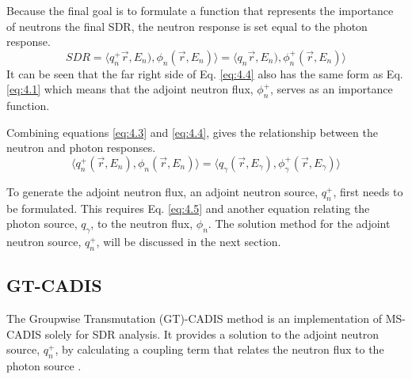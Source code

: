 Because the final goal is to formulate a function that represents the importance
of neutrons the final SDR, the
neutron response is set equal to the photon response.
\begin{equation} \label{eq:4.4}
  SDR =  \langle q_{n}^{+}\overrightarrow{r},E_{n}),
  \phi_{n}(\overrightarrow{r}, E_{n}) \rangle 
  = \langle q_{n}\overrightarrow{r},E_{n}),
  \phi_{n}^{+}(\overrightarrow{r}, E_{n}) \rangle 
\end{equation}
It can be seen that the far right side of Eq. \ref{eq:4.4} also has the same 
form as Eq. \ref{eq:4.1} which means that the adjoint neutron flux, $\phi_n^+$, 
serves as an importance function.

Combining equations \ref{eq:4.3} and \ref{eq:4.4}, 
gives the relationship between the neutron and photon responses.
\begin{equation} \label{eq:4.5}
	\langle q_{n}^{+}(\overrightarrow{r},E_{n}),
  \phi_{n}(\overrightarrow{r}, E_{n}) \rangle 
	= \langle q_{\gamma}(\overrightarrow{r},E_{\gamma}),
  \phi_{\gamma}^{+}(\overrightarrow{r}, E_{\gamma}) \rangle 
\end{equation}

To generate the adjoint neutron flux, 
an adjoint neutron source, $q_n^{+}$, first needs to be formulated.
This requires Eq. \ref{eq:4.5} and another equation
relating the photon source, $q_\gamma$, to the neutron flux, $\phi_n$.
The solution method for the adjoint neutron source, $q_n^+$, will be discussed in the 
next section.

\subsection{GT-CADIS}
The Groupwise Transmutation (GT)-CADIS method is an implementation of MS-CADIS
solely for SDR analysis.  It provides a solution to the adjoint neutron source, 
$q_n^+$, by calculating a coupling term that relates the neutron flux to the photon 
source \cite{gtcadis}.

